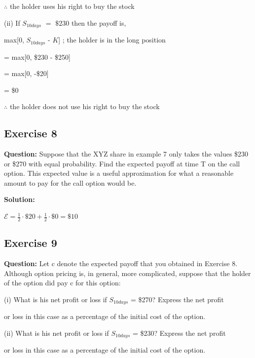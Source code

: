 \documentclass{article}
\begin{document}
$\therefore$ the holder uses his right to buy the stock 

\vspace{\baselineskip}

(ii)
If $S_{10 days}$ $=$ $\$230$ then the payoff is,
\vspace{\baselineskip}

max[0, $S_{10 days}$ - $K$] ; the holder is in the long position
\vspace{\baselineskip}

= max[0, \$230 - \$250]
\vspace{\baselineskip}

= max[0, -\$20]
\vspace{\baselineskip}

= \$0

$\therefore$ the holder does not use his right to buy the stock 

\subsection*{Exercise 8}

\textbf{Question:} Suppose that the XYZ share in example 7 only takes the values \$230 or \$270 with equal probability. Find the expected payoff at time T on the call option. This expected value is a useful approximation for what a reasonable amount to pay for the call option would be.

\textbf{Solution:}

$\mathscr{E} = \frac{1}{2} \cdot \$20 + \frac{1}{2} \cdot \$0 = \$10$

\subsection*{Exercise 9}

\textbf{Question:} Let c denote the expected payoff that you obtained in Exercise 8. Although option pricing is, in general, more complicated, suppose that the holder of the option did pay c for this option:

(i) What is his net profit or loss if $S_{10 days}$ = \$270? Express the net profit 

or loss in this case as a percentage of the initial cost of the option.

(ii) What is his net profit or loss if $S_{10 days}$ = \$230? Express the net profit 

or loss in this case as a percentage of the initial cost of the option.
\end{document}
